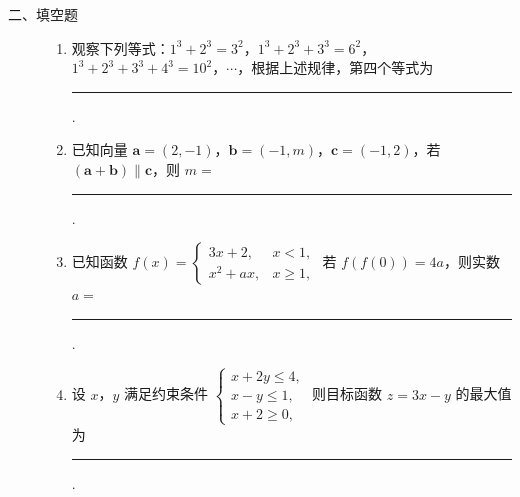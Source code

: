 \begin{description}

    \item[二、填空题]

    \begin{enumerate}[leftmargin=5pt]

      \addtocounter{enumi}{+10}

        \item 观察下列等式：\(1^{3} + 2^{3} = 3^{2}\)，\(1^{3} + 2^{3} + 3^{3} = 6^{2}\)，\(1^{3} + 2^{3} + 3^{3} + 4^{3} = 10^{2}\)，\(\cdots\)，根据上述规律，第四个等式为\rule[-0.3ex]{3em}{0.4pt}.

        \item 已知向量 \(\bm{a} = (2, -1)\)，\(\bm{b} = (-1, m)\)，\(\bm{c} = (-1, 2)\)，若 \((\bm{a} + \bm{b}) \parallel \bm{c}\)，则 \(m=\)\rule[-0.3ex]{3em}{0.4pt}.

        \item 已知函数 \( f(x) = \begin{cases}
3x + 2, & x < 1,\\
x^2 + ax, & x \geqslant 1,
\end{cases} \) 若 \( f(f(0)) = 4a \)，则实数 \( a = \)\rule[-0.3ex]{3em}{0.4pt}.

        \item 设 \(x\)，\(y\) 满足约束条件 \(\begin{cases}
x + 2y \leqslant 4,\\
x - y \leqslant 1,\\
x + 2 \geqslant 0,
\end{cases}\) 则目标函数 \(z = 3x - y\) 的最大值为\rule[-0.3ex]{3em}{0.4pt}.

    \end{enumerate}

\end{description}

